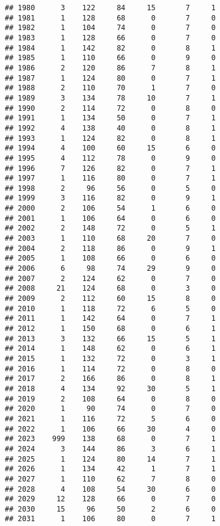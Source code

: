 \documentclass[
]{article}
\begin{document}
\begin{verbatim}
## 1980      3    122     84     15       7     1
## 1981      1    128     68      0       7     0
## 1982      1    104     74      0       7     0
## 1983      1    128     66      0       7     0
## 1984      1    142     82      0       8     1
## 1985      1    110     66      0       9     0
## 1986      2    120     86      7       8     1
## 1987      1    124     80      0       7     1
## 1988      2    110     70      1       7     0
## 1989      3    134     78     10       7     1
## 1990      2    114     72      0       8     0
## 1991      1    134     50      0       7     1
## 1992      4    138     40      0       8     1
## 1993      1    124     82      0       8     1
## 1994      4    100     60     15       6     0
## 1995      4    112     78      0       9     0
## 1996      7    126     82      0       7     1
## 1997      1    116     80      0       7     1
## 1998      2     96     56      0       5     0
## 1999      3    116     82      0       9     1
## 2000      2    106     54      1       6     0
## 2001      1    106     64      0       6     0
## 2002      2    148     72      0       5     1
## 2003      1    110     68     20       7     0
## 2004      2    118     86      0       9     1
## 2005      1    108     66      0       6     0
## 2006      6     98     74     29       9     0
## 2007      2    124     62      0       7     0
## 2008     21    124     68      0       3     0
## 2009      2    112     60     15       8     0
## 2010      1    118     72      6       5     0
## 2011      1    142     64      0       7     1
## 2012      1    150     68      0       6     1
## 2013      3    132     66     15       5     1
## 2014      1    148     62      0       6     1
## 2015      1    132     72      0       3     1
## 2016      1    114     72      0       8     0
## 2017      2    166     86      0       8     1
## 2018      4    134     92     30       5     1
## 2019      2    108     64      0       8     0
## 2020      1     90     74      0       7     0
## 2021      1    116     72      5       6     0
## 2022      1    106     66     30       4     0
## 2023    999    138     68      0       7     1
## 2024      3    144     86      3       6     1
## 2025      1    124     80     14       7     1
## 2026      1    134     42      1       7     1
## 2027      1    110     62      7       8     0
## 2028      4    108     54     30       6     0
## 2029     12    128     66      0       7     0
## 2030     15     96     50      2       6     0
## 2031      1    106     80      0       7     1

\end{verbatim}
\end{document}

